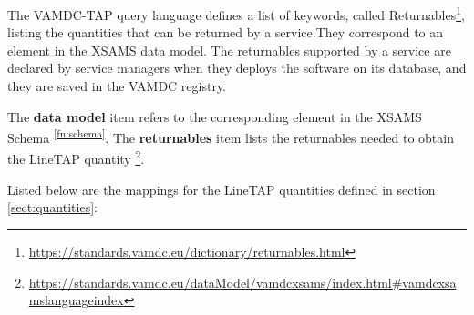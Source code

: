 \documentclass[11pt,a4paper]{ivoa}
\newcommand{\footref}[1]{\textsuperscript{\ref{#1}}}
\begin{document}
The VAMDC-TAP query language defines a list of keywords, called
Returnables\footnote{\url{https://standards.vamdc.eu/dictionary/returnables.html}},
listing the quantities that can be returned by a service.They correspond
to an element in the XSAMS data model.  The returnables supported by a
service are declared by service managers when they deploys the software
on its database, and they are saved in the VAMDC registry.

The \textbf{data model} item refers to the corresponding element in the XSAMS Schema
\footref{fn:schema}.
The \textbf{returnables} item lists the returnables needed to obtain the LineTAP quantity
\footnote{\url{https://standards.vamdc.eu/dataModel/vamdcxsams/index.html\#vamdcxsamslanguageindex}}. 

Listed below are the mappings for the LineTAP quantities defined in section
\ref{sect:quantities}:%
\end{document}

